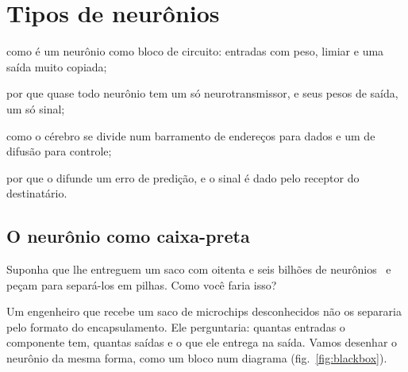 \chapter{Tipos de neurônios}
\label{sec:neurontypes}
\begin{chaptergoals}
\item como é um neurônio como bloco de circuito: entradas com peso, limiar e uma saída muito copiada;
\item por que quase todo neurônio tem um só neurotransmissor, e seus pesos de saída, um só sinal;
\item como o cérebro se divide num barramento de endereços para dados e um de difusão para controle;
\item por que o  difunde um erro de predição, e o sinal é dado pelo receptor do destinatário.
\end{chaptergoals}

\section{O neurônio como caixa-preta}

Suponha que lhe entreguem um saco com oitenta e seis bilhões de neurônios~\cite{Azevedo2009} e peçam para separá-los em pilhas. Como você faria isso?

Um engenheiro que recebe um saco de microchips desconhecidos não os separaria pelo formato do encapsulamento. Ele perguntaria: quantas entradas o componente tem, quantas saídas e o que ele entrega na saída. Vamos desenhar o neurônio da mesma forma, como um bloco num diagrama (fig.~\ref{fig:blackbox}).

